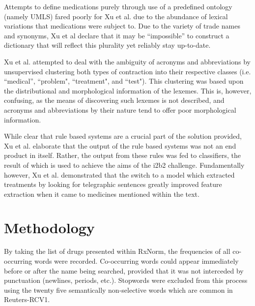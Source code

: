 Attempts to define medications purely through use of a predefined ontology (namely UMLS) fared poorly for Xu et al. due to the abundance of lexical variations that medications were subject to. Due to the variety of trade names and synonyms, Xu et al declare that it may be ``impossible'' to construct a dictionary that will reflect this plurality yet reliably stay up-to-date. 


Xu et al. attempted to deal with the ambiguity of acronyms and abbreviations by unsupervised clustering both types of contraction into their respective classes (i.e. ``medical'', ``problem", ``treatment", and ``test"). This clustering was based upon the distributional and morphological information of the lexemes. This is, however, confusing, as the means of discovering such lexemes is not described, and acronyms and abbreviations by their nature tend to offer poor morphological information.  

While clear that rule based systems are a crucial part of the solution provided, Xu et al. elaborate that the output of the rule based systems was not an end product in itself. Rather, the output from these rules was fed to classifiers, the result of which is used to achieve the aims of the i2b2 challenge. Fundamentally however, Xu et al. demonstrated that the switch to a model which extracted treatments by looking for telegraphic sentences greatly improved feature extraction when it came to medicines mentioned within the text. 
\\

\section{Methodology} 
 

By taking the list of drugs presented within RxNorm, the frequencies of all co-occurring words were recorded. Co-occurring words could appear immediately before or after the name being searched, provided that it was not interceded by punctuation (newlines, periods, etc.). Stopwords were excluded from this process using the twenty five semantically non-selective words which are common in Reuters-RCV1.\cite{sanderson2010christopher} 

